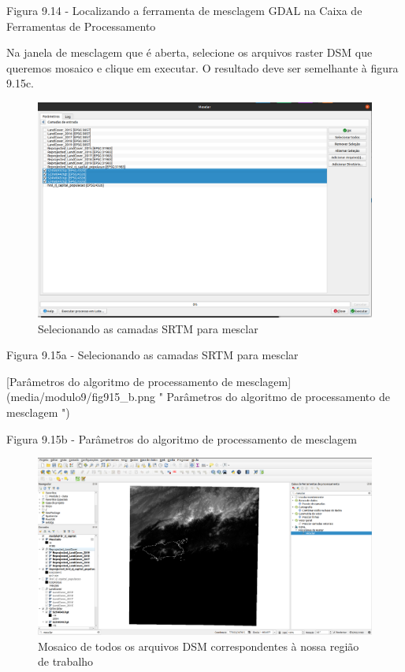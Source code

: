 \documentclass[
  portuguese,
]{krantz}
\begin{document}
Figura 9.14 - Localizando a ferramenta de mesclagem GDAL na Caixa de Ferramentas de Processamento

Na janela de mesclagem que é aberta, selecione os arquivos raster DSM que queremos mosaico e clique em executar. O resultado deve ser semelhante à figura 9.15c.

\begin{figure}
\centering
\includegraphics{media/modulo9/fig915_a.png}
\caption{Selecionando as camadas SRTM para mesclar}
\end{figure}

Figura 9.15a - Selecionando as camadas SRTM para mesclar

{[}Parâmetros do algoritmo de processamento de mesclagem{]}(media/modulo9/fig915\_b.png " Parâmetros do algoritmo de processamento de mesclagem ")

Figura 9.15b - Parâmetros do algoritmo de processamento de mesclagem

\begin{figure}
\centering
\includegraphics{media/modulo9/fig915_c.png}
\caption{Mosaico de todos os arquivos DSM correspondentes à nossa região de trabalho}
\end{figure}
\end{document}
